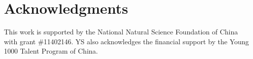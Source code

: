\documentclass{elsarticle}
\begin{document}
\section*{Acknowledgments}
  This work is supported by the National Natural Science Foundation of China with grant \#11402146. YS also acknowledges the financial support by the Young 1000 Talent Program of China.


%
\end{document}
